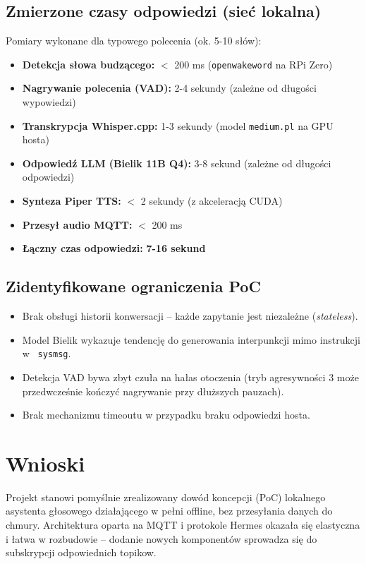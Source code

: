 \documentclass[12pt,a4paper]{article}
\begin{document}
\subsection{Zmierzone czasy odpowiedzi (sieć lokalna)}
Pomiary wykonane dla typowego polecenia (ok. 5-10 słów):
\begin{itemize}
    \item \textbf{Detekcja słowa budzącego:} $<$ 200 ms (\texttt{openwakeword} na RPi Zero)
    \item \textbf{Nagrywanie polecenia (VAD):} 2-4 sekundy (zależne od długości wypowiedzi)
    \item \textbf{Transkrypcja Whisper.cpp:} 1-3 sekundy (model \texttt{medium.pl} na GPU hosta)
    \item \textbf{Odpowiedź LLM (Bielik 11B Q4):} 3-8 sekund (zależne od długości odpowiedzi)
    \item \textbf{Synteza Piper TTS:} $<$ 2 sekundy (z akceleracją CUDA)
    \item \textbf{Przesył audio MQTT:} $<$ 200 ms
    \item \textbf{Łączny czas odpowiedzi:} \textbf{7-16 sekund}
\end{itemize}

\subsection{Zidentyfikowane ograniczenia PoC}
\begin{itemize}
    \item Brak obsługi historii konwersacji – każde zapytanie jest niezależne (\textit{stateless}).
    \item Model Bielik wykazuje tendencję do generowania interpunkcji mimo instrukcji w~ \texttt{sysmsg}.
    \item Detekcja VAD bywa zbyt czuła na hałas otoczenia (tryb agresywności 3 może przedwcześnie kończyć nagrywanie przy dłuższych pauzach).
    \item Brak mechanizmu timeoutu w przypadku braku odpowiedzi hosta.
\end{itemize}

\section{Wnioski}
Projekt stanowi pomyślnie zrealizowany dowód koncepcji (PoC) lokalnego asystenta głosowego działającego w pełni offline, bez przesyłania danych do chmury. Architektura oparta na MQTT i protokole Hermes okazała się elastyczna i łatwa w rozbudowie – dodanie nowych komponentów sprowadza się do subskrypcji odpowiednich topikow.
\end{document}
